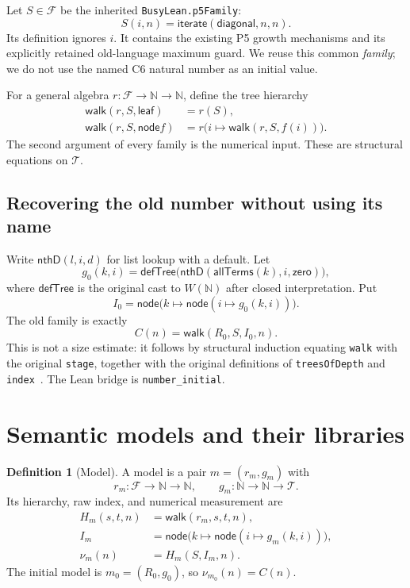 \documentclass[11pt,letterpaper]{article}
\theoremstyle{definition}
\newtheorem{definition}[theorem]{Definition}
\newcommand{\N}{\mathbb N}
\newcommand{\Tree}{\mathcal T}
\newcommand{\Fam}{\mathcal F}
\newcommand{\leaf}{\mathsf{leaf}}
\newcommand{\node}{\mathsf{node}}
\newcommand{\walk}{\mathsf{walk}}
\newcommand{\code}[1]{\nolinkurl{#1}}
\begin{document}
Let $S\in\Fam$ be the inherited \code{BusyLean.p5Family}:
\[
 S(i,n)=\mathsf{iterate}(\mathsf{diagonal},n,n).
\]
Its definition ignores $i$. It contains the existing P5 growth mechanisms and
its explicitly retained old-language maximum guard. We reuse this common
\emph{family}; we do not use the named C6 natural number as an initial value.

For a general algebra $r:\Fam\to\N\to\N$, define the tree hierarchy
\begin{align}
 \walk(r,S,\leaf)&=r(S),\\
 \walk(r,S,\node f)&=r\bigl(i\mapsto\walk(r,S,f(i))\bigr).
\label{eq:walk}
\end{align}
The second argument of every family is the numerical input. These are
structural equations on $\Tree$.

\subsection{Recovering the old number without using its name}

Write $\mathsf{nthD}(l,i,d)$ for list lookup with a default. Let
\[
 g_0(k,i)=\mathsf{defTree}\bigl(
        \mathsf{nthD}(\mathsf{allTerms}(k),i,\mathsf{zero})\bigr),
\]
where $\mathsf{defTree}$ is the original cast to $W(\N)$ after closed
interpretation. Put
\[
 I_0=\node\bigl(k\mapsto\node(i\mapsto g_0(k,i))\bigr).
\]
The old family is exactly
\begin{equation}
 C(n)=\walk(R_0,S,I_0,n).
\label{eq:baseline}
\end{equation}
This is not a size estimate: it follows by structural induction equating
\code{walk} with the original \code{stage}, together with the original
definitions of \code{treesOfDepth} and \code{index}~\cite{c6}.
The Lean bridge is \code{number_initial}.

\section{Semantic models and their libraries}
\label{sec:models}

\begin{definition}[Model]
A model is a pair $m=(r_m,g_m)$ with
\[
 r_m:\Fam\to\N\to\N,
 \qquad g_m:\N\to\N\to\Tree.
\]
Its hierarchy, raw index, and numerical measurement are
\begin{align}
 H_m(s,t,n)&=\walk(r_m,s,t,n),\\
 I_m&=\node\bigl(k\mapsto\node(i\mapsto g_m(k,i))\bigr),\\
 \nu_m(n)&=H_m(S,I_m,n).
\end{align}
The initial model is $m_0=(R_0,g_0)$, so $\nu_{m_0}(n)=C(n)$.
\end{definition}
\end{document}
